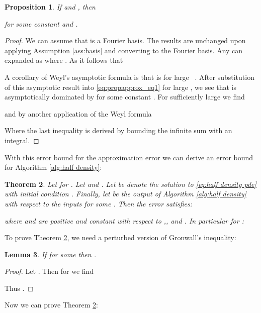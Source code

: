 \documentclass[final,leqno]{amsart}
\newtheorem{theorem}{Theorem}[section]
\newtheorem{proposition}[theorem]{Proposition}
\newtheorem{lemma}[theorem]{Lemma}
\begin{document}
\begin{proposition} \label{prop:approximation}
	If  and ,
	then
	
	for some constant  and .
\end{proposition}
\begin{proof}
	We can assume that  is a Fourier basis.
	The results are unchanged upon applying Assumption \ref{ass:basis} and converting to the Fourier basis.
	Any  can expanded as  where .
	As  it follows that
	
	A corollary of Weyl's asymptotic formula is that  is  for large  ~\cite[page 155]{Chavel1984}.
	After substitution of this asymptotic result into \eqref{eq:propapprox_eq1} for large , we see that  is asymptotically dominated by   for some constant .
	For sufficiently large  we find
	
	and by another application of the Weyl formula
	
	Where the last inequality is derived by bounding the infinite sum with an integral.
\end{proof}



With this error bound for the approximation error we can derive an error bound for Algorithm \ref{alg:half density}:

\begin{theorem} \label{thm:half density convergence}
	Let  for .
	Let  and .
	Let  be denote the solution to \eqref{eq:half density pde}
	with initial condition .
	Finally, let  be the output of Algorithm \ref{alg:half density}
	with respect to the inputs  for some .
	Then the error  satisfies:
	
	where  and  are positive and constant with respect to ,, and .
	In particular for :
	
\end{theorem}

\noindent To prove Theorem \ref{thm:half density convergence}, we need a perturbed version of Gronwall's inequality:
\begin{lemma} \label{lem:Gronwall}
If  for some  then .
\end{lemma}
\begin{proof}
	Let .  Then for  we find
	
	Thus .
\end{proof}

Now we can prove Theorem \ref{thm:half density convergence}:
\end{document}
